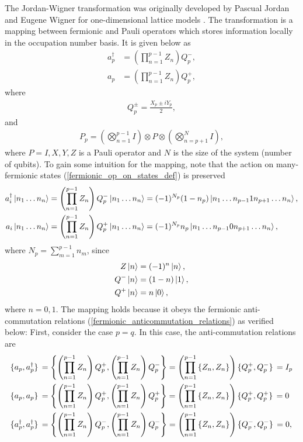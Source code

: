 \documentclass[Dual]{msu-thesis}
\newcommand{\dagg}[1]{{#1^{\dagger}}}
\begin{document}
The Jordan-Wigner transformation was originally developed by Pascual Jordan and Eugene Wigner for one-dimensional lattice models \cite{ref:jwt}. The transformation is a mapping between fermionic and Pauli operators which stores information locally in the occupation number basis. It is given below as
\begin{align}
\label{jwt}
a^\dagger_p&=\left(\prod_{n=1}^{p-1}Z_n\right)Q^-_p,
\\
a_p&=\left(\prod_{n=1}^{p-1}Z_n\right)Q^+_p
,\end{align}
where
\begin{align}
Q^{\pm}_p
=
\frac{X_p \pm i Y_p}{2}
,\end{align}
and
\begin{align}
P_p = \left(\bigotimes_{n=1}^{p-1}I\right)\otimes P \otimes \left(\bigotimes_{n=p+1}^{N}I\right)
,\end{align}
where $P=I,X,Y,Z$ is a Pauli operator and $N$ is the size of the system (number of qubits). To gain some intuition for the mapping, note that the action on many-fermionic states (\ref{fermionic_op_on_states_def}) is preserved
\begin{align}
\dagg{a_i}\ket{n_1\ldots n_n}
&=
\left(\prod_{n=1}^{p-1}Z_n\right)Q^-_p\ket{n_1\ldots n_n}
=
(-1)^{N_p}(1-n_p)\ket{n_1\ldots n_{p-1}1n_{p+1}\ldots n_n},
\\
a_i\ket{n_1\ldots n_n}
&=
\left(\prod_{n=1}^{p-1}Z_n\right)Q^+_p\ket{n_1\ldots n_n}
=
(-1)^{N_p}n_p\ket{n_1\ldots n_{p-1}0n_{p+1}\ldots n_n},
\end{align}
where $N_p=\sum_{m=1}^{p-1}n_m$, since
\begin{align}
Z\ket{n}&=(-1)^n\ket{n},
\\
Q^-\ket{n}&=(1-n)\ket{1},
\\
Q^+\ket{n}&=n\ket{0},
\end{align}
where $n=0,1$. The mapping holds because it obeys the fermionic anti-commutation relations (\ref{fermionic_anticommutation_relations}) as verified below: First, consider the case $p=q$. In this case, the anti-commutation relations are
\begin{align}
\acomm*{a_p}{a^\dagger_p}
&=
\acomm{\left(\prod_{n=1}^{p-1}Z_n\right)Q^+_p}{\left(\prod_{n=1}^{p-1}Z_n\right)Q^-_p}
=
\left(\prod_{n=1}^{p-1}\acomm{Z_n}{Z_n}\right)
\acomm*{Q^+_p}{Q^-_p}
=
I_p
\\
\acomm*{a_p}{a_p}
&=
\acomm{\left(\prod_{n=1}^{p-1}Z_n\right)Q^+_p}{\left(\prod_{n=1}^{p-1}Z_n\right)Q^+_p}
=
\left(\prod_{n=1}^{p-1}\acomm{Z_n}{Z_n}\right)
\acomm*{Q^+_p}{Q^+_p}
=
0
\\
\acomm*{a^\dagger_p}{a^\dagger_p}
&=
\acomm{\left(\prod_{n=1}^{p-1}Z_n\right)Q^-_p}{\left(\prod_{n=1}^{p-1}Z_n\right)Q^-_p}
=
\left(\prod_{n=1}^{p-1}\acomm{Z_n}{Z_n}\right)
\acomm*{Q^-_p}{Q^-_p}
=
0,
\end{align}
\end{document}
